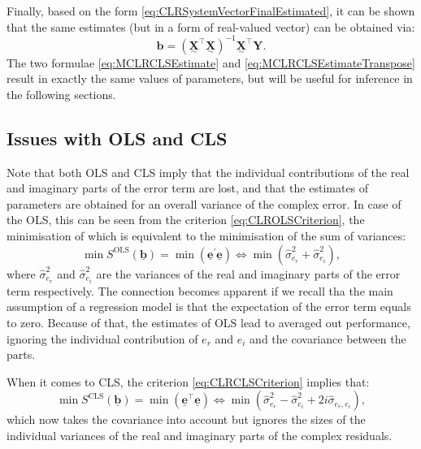 \documentclass[
]{book}
\begin{document}
Finally, based on the form \eqref{eq:CLRSystemVectorFinalEstimated}, it can be shown that the same estimates (but in a form of real-valued vector) can be obtained via:
\begin{equation}
    \boldsymbol{b} = \left( \underset{\sim}{\mathbf{X}}^\top \underset{\sim}{\mathbf{X}}\right)^{-1} \underset{\sim}{\mathbf{{X}}}^\top {\mathbf{Y}} .
    \label{eq:MCLRCLSEstimateTranspose}
\end{equation}
The two formulae \eqref{eq:MCLRCLSEstimate} and \eqref{eq:MCLRCLSEstimateTranspose} result in exactly the same values of parameters, but will be useful for inference in the following sections.

\hypertarget{CLREstimationIssue}{%
\subsection{Issues with OLS and CLS}\label{CLREstimationIssue}}

Note that both OLS and CLS imply that the individual contributions of the real and imaginary parts of the error term are lost, and that the estimates of parameters are obtained for an overall variance of the complex error. In case of the OLS, this can be seen from the criterion \eqref{eq:CLROLSCriterion}, the minimisation of which is equivalent to the minimisation of the sum of variances:
\begin{equation}
    \min S^{\mathrm{OLS}}(\underline{\boldsymbol{b}}) = \min \left(\underline{\mathbf{e}}^\prime \underline{\mathbf{e}}\right) \iff \min \left(\hat{\sigma}_{e_r}^2 + \hat{\sigma}_{e_i}^2 \right),
    \label{eq:CLROLSCriterionVariance}
\end{equation}
where \(\hat{\sigma}_{e_r}^2\) and \(\hat{\sigma}_{e_i}^2\) are the variances of the real and imaginary parts of the error term respectively. The connection becomes apparent if we recall tha the main assumption of a regression model is that the expectation of the error term equals to zero. Because of that, the estimates of OLS lead to averaged out performance, ignoring the individual contribution of \(e_r\) and \(e_i\) and the covariance between the parts.

When it comes to CLS, the criterion \eqref{eq:CLRCLSCriterion} implies that:
\begin{equation}
    \min S^{\mathrm{CLS}}(\underline{\boldsymbol{b}}) = \min \left(\underline{\mathbf{e}}^\top \underline{\mathbf{e}}\right) \iff \min \left(\hat{\sigma}_{e_r}^2 - \hat{\sigma}_{e_i}^2 + 2i \hat{\sigma}_{e_r, e_i} \right),
    \label{eq:CLRCLSCriterionVariance}
\end{equation}
which now takes the covariance into account but ignores the sizes of the individual variances of the real and imaginary parts of the complex residuals.
\end{document}
